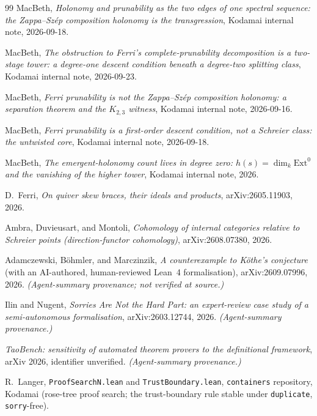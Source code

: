 \documentclass[11pt]{report}
\theoremstyle{plain}
\theoremstyle{definition}
\theoremstyle{remark}
\newcommand{\Hcoh}{H^2}
\newcommand{\Ext}{\mathrm{Ext}}
\begin{document}
\begin{thebibliography}{99}
 MacBeth, \emph{Holonomy and prunability as the two edges of one spectral sequence: the Zappa--Sz\'ep composition holonomy is the transgression}, Kodamai internal note, 2026-09-18.

 MacBeth, \emph{The obstruction to Ferri's complete-prunability decomposition is a two-stage tower: a degree-one descent condition beneath a degree-two splitting class}, Kodamai internal note, 2026-09-23.

 MacBeth, \emph{Ferri prunability is not the Zappa--Sz\'ep composition holonomy: a separation theorem and the $K_{2,3}$ witness}, Kodamai internal note, 2026-09-16.

 MacBeth, \emph{Ferri prunability is a first-order descent condition, not a Schreier class: the untwisted core}, Kodamai internal note, 2026-09-18.

 MacBeth, \emph{The emergent-holonomy count lives in degree zero: $h(s)=\dim_k\Ext^0$ and the vanishing of the higher tower}, Kodamai internal note, 2026.

 D.~Ferri, \emph{On quiver skew braces, their ideals and products}, arXiv:2605.11903, 2026.

 Ambra, Duvieusart, and Montoli, \emph{Cohomology of internal categories relative to Schreier points (direction-functor cohomology)}, arXiv:2608.07380, 2026.

 Adamczewski, B\"ohmler, and Marczinzik, \emph{A counterexample to K\"othe's conjecture} (with an AI-authored, human-reviewed Lean~4 formalisation), arXiv:2609.07996, 2026. \emph{(Agent-summary provenance; not verified at source.)}

 Ilin and Nugent, \emph{Sorries Are Not the Hard Part: an expert-review case study of a semi-autonomous formalisation}, arXiv:2603.12744, 2026. \emph{(Agent-summary provenance.)}

 \emph{TaoBench: sensitivity of automated theorem provers to the definitional framework}, arXiv 2026, identifier unverified. \emph{(Agent-summary provenance.)}

 R.~Langer, \texttt{ProofSearchN.lean} and \texttt{TrustBoundary.lean}, \texttt{containers} repository, Kodamai (rose-tree proof search; the trust-boundary rule stable under \texttt{duplicate}, \texttt{sorry}-free).


\end{thebibliography}
\end{document}
